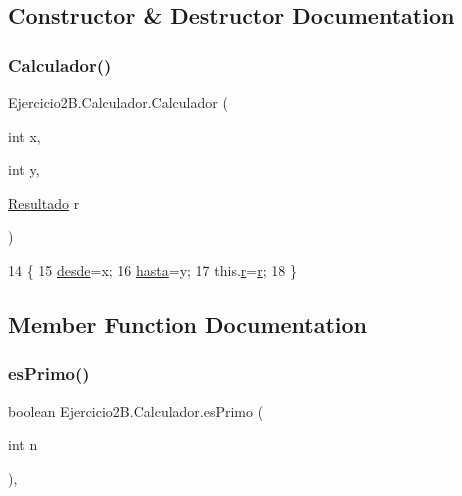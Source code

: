 \subsection{Constructor \& Destructor Documentation}
\mbox{\label{class_ejercicio2_b_1_1_calculador_a41f0905d74cf3b5a0d7610a3bbe46f2b}} 
\subsubsection{\texorpdfstring{Calculador()}{Calculador()}}
{\footnotesize\ttfamily Ejercicio2\+B.\+Calculador.\+Calculador (\begin{DoxyParamCaption}\item[{int}]{x,  }\item[{int}]{y,  }\item[{\mbox{\hyperlink{class_ejercicio2_b_1_1_resultado}{Resultado}}}]{r }\end{DoxyParamCaption})\hspace{0.3cm}{\ttfamily [inline]}}


\begin{DoxyCode}
14     \{
15         \mbox{\hyperlink{class_ejercicio2_b_1_1_calculador_a083a56485cec186e46dbcff1adcecd15}{desde}}=x;
16         \mbox{\hyperlink{class_ejercicio2_b_1_1_calculador_a84375442ba851669a0ff1db314543783}{hasta}}=y;
17         this.\mbox{\hyperlink{class_ejercicio2_b_1_1_calculador_ad77e58621891d2594748d725f92e92e5}{r}}=\mbox{\hyperlink{class_ejercicio2_b_1_1_calculador_ad77e58621891d2594748d725f92e92e5}{r}};
18     \}
\end{DoxyCode}


\subsection{Member Function Documentation}
\mbox{\label{class_ejercicio2_b_1_1_calculador_a0ec732ad45b3f85cc7511729b618ef76}} 
\subsubsection{\texorpdfstring{es\+Primo()}{esPrimo()}}
{\footnotesize\ttfamily boolean Ejercicio2\+B.\+Calculador.\+es\+Primo (\begin{DoxyParamCaption}\item[{int}]{n }\end{DoxyParamCaption})\hspace{0.3cm}{\ttfamily [inline]}, {\ttfamily [private]}}


